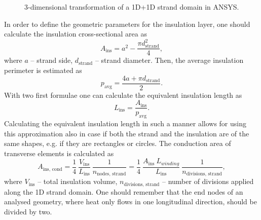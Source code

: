 \begin{figure}[H]
    \caption{3-dimensional transformation of a 1D+1D strand domain in ANSYS.}
    \label{fig: 1d_strand_geometry_with_insulation}
\end{figure}

In order to define the geometric parameters for the insulation layer, one should calculate the insulation cross-sectional area as
\begin{equation}
    A_\text{ins} = a^2 - \frac{\pi d_\text{strand}^2}{4}, 
    \label{eqn:cross_sectional_area_insulation}
\end{equation}
where $a$ -- strand side, $d_\text{strand}$ -- strand diameter. Then, the average insulation perimeter is estimated as
\begin{equation}
    p_\text{avg} = \frac{4 a + \pi d_\text{strand}}{2}.
    \label{eqn:average_perimeter}
\end{equation}
With two first formulae one can calculate the equivalent insulation length as 
\begin{equation}
    L_\text{ins} = \frac{A_\text{ins}}{p_\text{avg}}.
    \label{eqn:equivalent_insulation_length}
\end{equation}
Calculating the equivalent insulation length in such a manner allows for using this approximation also in case if both the strand and the insulation are of the same shapes, e.g. if they are rectangles or circles. The conduction area of transverse elements is calculated as
\begin{equation}
    A_\text{ins, cond} = \frac{1}{4}~\frac{ V_\text{ins}}{L_\text{ins}}~\frac{1}{n_\text{nodes, strand}}= \frac{1}{4}~\frac{ A_\text{ins} ~ L_{winding}}{L_\text{ins}}~\frac{1}{n_\text{divisions, strand}},
    \label{eqn:equivalent_insulation_element_area}
\end{equation}
where $V_\text{ins}$ -- total insulation volume, $n_\text{divisions, strand}$ -- number of divisions applied along the 1D strand domain. One should remember that the end nodes of an analysed geometry, where heat only flows in one longitudinal direction, should be divided by two.

